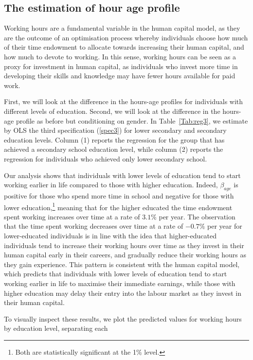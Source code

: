 \documentclass[12pt]{article}
\begin{document}
\subsection{The estimation of hour age profile}
Working hours are a fundamental variable in the human capital model, as they are the outcome of an optimisation process
whereby individuals choose how much of their time endowment to allocate towards increasing their human capital, and how
much to devote to working. In this sense, working hours can be seen as a proxy for investment in human capital, as
individuals who invest more time in developing their skills and knowledge may have fewer hours available for paid
work.\par
First, we will look at the difference in the hours-age profiles for individuals with different levels of education.
Second, we will look at the difference in the hours-age profile as before but conditioning on gender. In
Table~\ref{Tab:reg3}, we estimate by OLS the third specification (\ref{spec3}) for lower secondary and secondary
education levels. Column (1) reports the regression for the group that has achieved a secondary school education level,
while column (2) reports the regression for individuals who achieved only lower secondary school.
\par
Our analysis shows that individuals with lower levels of education tend to start working earlier in life compared to
those with higher education. Indeed, $\beta_{age}$ is positive for those who spend more time in school and negative for
those with lower education,\footnote{Both are statistically significant at the 1\% level.} meaning that for the higher
educated the time endowment spent working increases over time at
a rate of $3.1\%$ per year.  The observation that the time spent working decreases over time at a rate of $-0.7\%$ per
year for lower-educated individuals is in line with the idea that higher-educated individuals tend to increase their
working hours over time as they invest in their human capital early in their careers, and gradually reduce their working
hours as they gain experience. This pattern is consistent with the human capital model, which predicts that individuals
with lower levels of education tend to start working earlier in life to maximise their immediate earnings, while those
with higher education may delay their entry into the labour market as they invest in their human capital.
\par
To visually inspect these results, we plot the predicted values for working hours by education level, separating each
\end{document}
